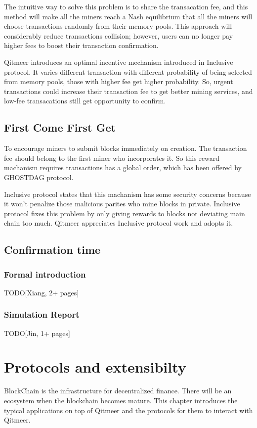 \documentclass[a4paper,11pt]{article}
\begin{document}
The intuitive way to solve this problem is to share the transacation fee, and this method will make all the miners reach a Nash equilibrium that all the miners will choose transactions randomly from their memory pools. This approach will considerably reduce transactions collision; however, users can no longer pay higher fees to boost their transaction confirmation. 

Qitmeer introduces an optimal incentive mechanism introduced in Inclusive protocol. It varies different transaction with different probability of being selected from memory pools, those with higher fee get higher probability. So, urgent transactions could increase their transaction fee to get better mining services, and low-fee transacations still get opportunity to confirm.

\subsection{First Come First Get}
To encourage miners to submit blocks immediately on creation. The transaction fee should belong to the first miner who incorporates it. So this reward machanism requires transactions has a global order, which has been offered by GHOSTDAG protocol. 

Inclusive protocol states that this machanism has some security concerns because it won't penalize those malicious parites who mine blocks in private. Inclusive protocol fixes this problem by only giving rewards to blocks not deviating main chain too much. Qitmeer appreciates Inclusive protocol work and adopts it.

\subsection{Confirmation time}
\subsubsection{Formal introduction}
TODO[Xiang, 2+ pages]
\subsubsection{Simulation Report}
TODO[Jin, 1+ pages]

\section{Protocols and extensibilty}
BlockChain is the infrastructure for  decentralized finance. There will be an ecosystem when the blockchain becomes mature. This chapter introduces the typical applications on top of Qitmeer and the protocols for them to interact with Qitmeer. 
\end{document}
